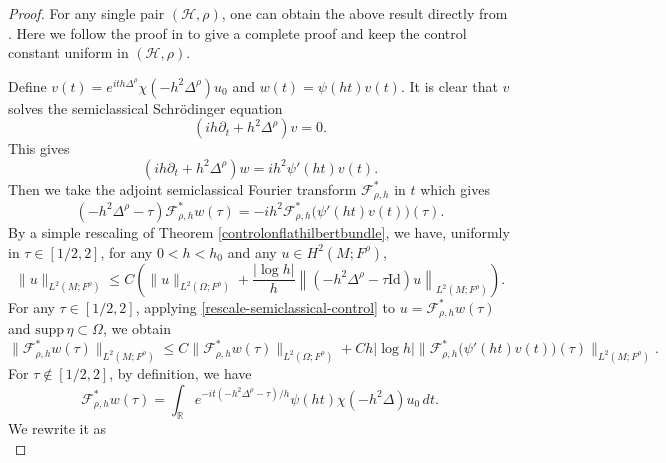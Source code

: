 \documentclass[11pt,oneside,reqno]{amsart}
\newcommand\R{\ensuremath{\mathbb{R}}}
\theoremstyle{definition}
\numberwithin{equation}{section}
\theoremstyle{plain}
\begin{document}
\begin{proof}
    For any single pair $(\mathcal{H},\rho)$, one can obtain the above result directly from \cite[Theorem 4]{burq2004}. Here we follow the proof in \cite[Proposition 2.1]{jin2018control} to give a complete proof and keep the control constant uniform in $(\mathcal{H},\rho)$. 
    
    Define $v(t)=e^{ith\Delta^\rho }\chi(-h^2\Delta^\rho)u_0$ and $w(t)=\psi(ht)v(t)$. It is clear that $v$ solves the semiclassical Schrödinger equation 
    \begin{equation*}
        (ih\partial_t +h^2\Delta^\rho) v=0.
    \end{equation*}
    This gives 
    \begin{equation*}
        (ih\partial_t+h^2\Delta^\rho)w=ih^2\psi'(ht)v(t).
    \end{equation*}
    Then we take the adjoint semiclassical Fourier transform $\mathcal{F}_{\rho,h}^*$ in $t$ which gives
    \begin{equation*}
        (-h^2\Delta^\rho-\tau)\mathcal{F}_{\rho,h}^*w(\tau)=-ih^2\mathcal{F}_{\rho,h}^*\bigl( \psi'(ht)v(t) \bigr)(\tau).
    \end{equation*}
    By a simple rescaling of Theorem \ref{controlonflathilbertbundle}, we have, uniformly in $\tau\in [1/2,2]$, for any $0<h<h_0 $ and any $u\in H^2(M;F^\rho)$,
    \begin{equation}\label{rescale-semiclassical-control}
        \|u\|_{L^2(M;F^\rho)} \leq C\left(\|u\|_{L^2(\Omega;F^{\rho})}+ \frac{|\log h|}{h}\left\|\left(-h^2 \Delta^{\rho}-\tau\mathrm{Id}\right) u\right\|_{L^2(M;F^{\rho})}\right).   
    \end{equation}
    For any $\tau \in [1/2,2]$, applying \eqref{rescale-semiclassical-control} to $u=\mathcal{F}_{\rho,h}^* w(\tau)$ and $\mathrm{supp}\, \eta \subset \Omega$, we obtain
    \begin{equation}
        \|\mathcal{F}_{\rho,h}^*w(\tau)\|_{L^2(M;F^\rho)}\le  C\|\mathcal{F}_{\rho,h}^* w(\tau) \|_{L^2(\Omega;F^\rho)}+Ch|\log h|\| \mathcal{F}_{\rho,h}^*\bigl( \psi'(ht)v(t) \bigr)(\tau) \|_{L^2(M;F^\rho)}.\label{eqn-tau-in}
    \end{equation}
    For $\tau \not\in [1/2,2]$, by definition, we have
    \begin{equation*}
        \mathcal{F}_{\rho, h}^*w(\tau) =\int_\R e^{-it(-h^2\Delta^\rho-\tau)/h}\psi(ht)\chi(-h^2\Delta) u_0\,d t.
    \end{equation*}
    We rewrite it as
    \begin{equation}

\end{equation}
\end{proof}
\end{document}
